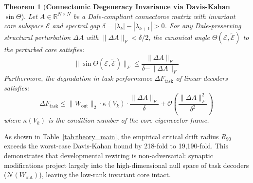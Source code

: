 \documentclass[10pt,twocolumn,letterpaper]{article}
\newtheorem{theorem}{Theorem}
\begin{document}
\begin{theorem}[\textbf{Connectomic Degeneracy Invariance via Davis-Kahan $\sin\Theta$}]
Let $A \in \mathbb{R}^{N \times N}$ be a Dale-compliant connectome matrix with invariant core subspace $\mathcal{E}$ and spectral gap $\delta = |\lambda_k| - |\lambda_{k+1}| > 0$. For any Dale-preserving structural perturbation $\Delta A$ with $\|\Delta A\|_F < \delta / 2$, the canonical angle $\Theta(\mathcal{E}, \tilde{\mathcal{E}})$ to the perturbed core satisfies:
\begin{equation}
\|\sin\Theta(\mathcal{E}, \tilde{\mathcal{E}})\|_F \le \frac{\|\Delta A\|_F}{\delta - \|\Delta A\|_F}
\end{equation}
Furthermore, the degradation in task performance $\Delta F_{\mathrm{task}}$ of linear decoders satisfies:
\begin{equation}
\Delta F_{\mathrm{task}} \le \|W_{\mathrm{out}}\|_2 \cdot \kappa(V_k) \cdot \frac{\|\Delta A\|_F}{\delta} + \mathcal{O}\left( \frac{\|\Delta A\|_F^2}{\delta^2} \right)
\end{equation}
where $\kappa(V_k)$ is the condition number of the core eigenvector frame.
\end{theorem}

\begin{table}[h]
\centering
\small
\caption{\textbf{Theoretical Invariance Bounds vs Empirical $R_{90}$ Across 4 Phyla.}}
\label{tab:theory_main}
\end{table}

As shown in Table~\ref{tab:theory_main}, the empirical critical drift radius $R_{90}$ exceeds the worst-case Davis-Kahan bound by 218-fold to 19,190-fold. This demonstrates that developmental rewiring is non-adversarial: synaptic modifications project largely into the high-dimensional null space of task decoders ($\mathcal{N}(W_{\mathrm{out}})$), leaving the low-rank invariant core intact.
\end{document}
